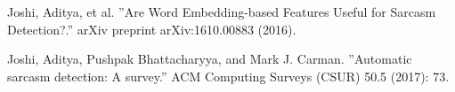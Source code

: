 

\begin{thebibliography}{1}

Joshi, Aditya, et al. ''Are Word Embedding-based Features Useful for Sarcasm Detection?.'' arXiv preprint arXiv:1610.00883 (2016).
  
Joshi, Aditya, Pushpak Bhattacharyya, and Mark J. Carman.  ''Automatic sarcasm detection: A survey.'' ACM Computing Surveys (CSUR) 50.5 (2017): 73.

\end{thebibliography}
